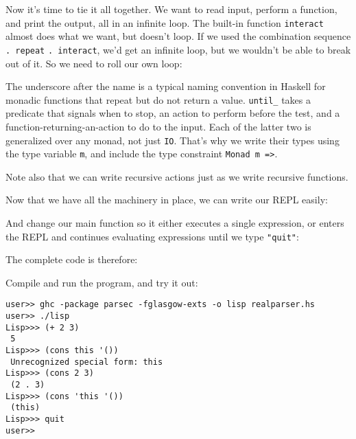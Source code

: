 Now it's time to tie it all together. We want to read input, perform a function, and print the output, all in an infinite loop. The built-in function \verb|interact| almost does what we want, but doesn't loop. If we used the combination sequence \verb|. repeat| \verb|. interact|, we'd get an infinite loop, but we wouldn't be able to break out of it. So we need to roll our own loop:
 
 
The underscore after the name is a typical naming convention in Haskell for monadic functions that repeat but do not return a value. \verb|until_| takes a predicate that signals when to stop, an action to perform before the test, and a function-returning-an-action to do to the input. Each of the latter two is generalized over any monad, not just \verb|IO|. That's why we write their types using the type variable \verb|m|, and include the type constraint \lstinline|Monad m =>|.
 
Note also that we can write recursive actions just as we write recursive functions.
 
Now that we have all the machinery in place, we can write our REPL easily:
 
 
And change our main function so it either executes a single expression, or enters the REPL and continues evaluating expressions until we type \lstinline|"quit"|:
 
 
The complete code is therefore:
 
 
Compile and run the program, and try it out:
 
\begin{lstlisting}[language=shell,numbers=none,nolol]
user>> ghc -package parsec -fglasgow-exts -o lisp realparser.hs
user>> ./lisp
Lisp>>> (+ 2 3)
 5
Lisp>>> (cons this '())
 Unrecognized special form: this
Lisp>>> (cons 2 3)
 (2 . 3)
Lisp>>> (cons 'this '())
 (this)
Lisp>>> quit
user>>
\end{lstlisting}
